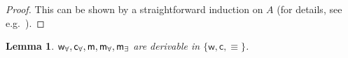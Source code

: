 \documentclass[conference,twosided,10pt]{IEEEtran}
\newcommand{\lutz}[1]{{\color{blue}     \noindent[\![\![{\bf Lutz: }#1]\!]\!]}}
\newcommand{\juihsuan}[1]{{\color{violet}     \noindent[\![\![{\bf Jui-Hsuan: }#1]\!]\!]}}
\newcommand{\todo}[1]{{\color{red}     \noindent[\![\![{\bf TODO: }#1]\!]\!]}}
\newtheorem{lemma}[thm]{Lemma}
\theoremstyle{definition}
\newcommand{\fequ}{\equiv}
\newcommand{\sysS}{\mathsf{S}}
\newcommand\wrD {\mathsf{w}}
\renewcommand\cD {\mathsf{c}}
\renewcommand\acD {\mathsf{ac}}
\newcommand\wfaD {\mathsf{w_\forall}}
\newcommand\cfaD {\mathsf{c_\forall}}
\newcommand\mfaD {\mathsf{m_\forall}}
\newcommand\mexD {\mathsf{m_\exists}}
\newcommand{\set}[1]{\{#1\}}
\begin{document}
\begin{proof}
  This can be shown by a straightforward induction on $A$ (for details, see e.g.~\cite{brunnler:phd}).
\end{proof}

\begin{lemma}
  \label{lem:me}
  $\wfaD,\cfaD,\me,\mfaD,\mexD$ are derivable in \hbox{$\set{\wrD,\cD,\fequ}$}. 
\end{lemma}
\end{document}
